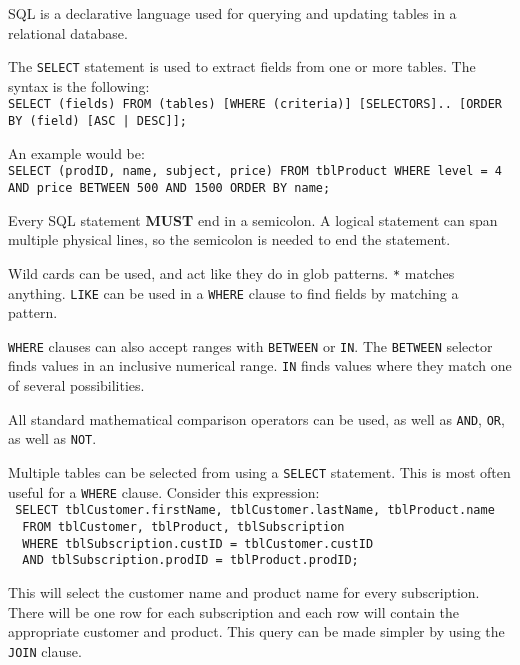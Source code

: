 \documentclass[../main.tex]{subfile}
\begin{document}

SQL is a declarative language used for querying and updating tables in a relational database.

The \texttt{SELECT} statement is used to extract fields from one or more tables. The syntax is the following:\\
\texttt{SELECT (fields) FROM (tables) [WHERE (criteria)] [SELECTORS].. [ORDER BY (field) [ASC | DESC]];}

An example would be:\\
\texttt{SELECT (prodID, name, subject, price) FROM tblProduct WHERE level = 4 AND price BETWEEN 500 AND 1500 ORDER BY name;}

Every SQL statement \textbf{MUST} end in a semicolon. A logical statement can span multiple physical lines, so the semicolon is needed to end the statement.


Wild cards can be used, and act like they do in glob patterns. \texttt{*} matches anything. \texttt{LIKE} can be used in a \texttt{WHERE} clause to find fields by matching a pattern.

\texttt{WHERE} clauses can also accept ranges with \texttt{BETWEEN} or \texttt{IN}. The \texttt{BETWEEN} selector finds values in an inclusive numerical range. \texttt{IN} finds values where they match one of several possibilities.

All standard mathematical comparison operators can be used, as well as \texttt{AND}, \texttt{OR}, as well as \texttt{NOT}.


Multiple tables can be selected from using a \texttt{SELECT} statement. This is most often useful for a \texttt{WHERE} clause. Consider this expression:\\
\texttt{
SELECT tblCustomer.firstName, tblCustomer.lastName, tblProduct.name\\
  FROM tblCustomer, tblProduct, tblSubscription\\
  WHERE tblSubscription.custID = tblCustomer.custID\\
  AND tblSubscription.prodID = tblProduct.prodID;
}

This will select the customer name and product name for every subscription. There will be one row for each subscription and each row will contain the appropriate customer and product. This query can be made simpler by using the \texttt{JOIN} clause.
\end{document}

